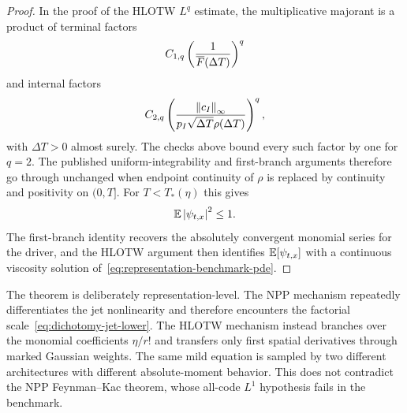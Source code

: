 \begin{proof}
In the proof of the HLOTW $L^q$ estimate, the multiplicative majorant is a product of terminal factors
\begin{equation*}
  C_{1,q}\left(\frac1{\overline F(\Delta T)}\right)^q
\end{equation*}
and internal factors
\begin{equation*}
  C_{2,q}
  \left(
    \frac{\left\lVert c_I\right\rVert_\infty}
    {p_I\sqrt{\Delta T}\rho(\Delta T)}
  \right)^q,
\end{equation*}
with $\Delta T>0$ almost surely. The checks above bound every such factor by one for $q=2$. The published uniform-integrability and first-branch arguments therefore go through unchanged when endpoint continuity of $\rho$ is replaced by continuity and positivity on $(0,T]$. For $T<T_*(\eta)$ this gives
\begin{equation*}
  \mathbb E\left|\psi_{t,x}\right|^2\leq1.
\end{equation*}
The first-branch identity recovers the absolutely convergent monomial series for the driver, and the HLOTW argument then identifies $\mathbb E[\psi_{t,x}]$ with a continuous viscosity solution of~\eqref{eq:representation-benchmark-pde}.
\end{proof}

The theorem is deliberately representation-level. The NPP mechanism repeatedly differentiates the jet nonlinearity and therefore encounters the factorial scale~\eqref{eq:dichotomy-jet-lower}. The HLOTW mechanism instead branches over the monomial coefficients $\eta/r!$ and transfers only first spatial derivatives through marked Gaussian weights. The same mild equation is sampled by two different architectures with different absolute-moment behavior. This does not contradict the NPP Feynman--Kac theorem, whose all-code $L^1$ hypothesis fails in the benchmark.
